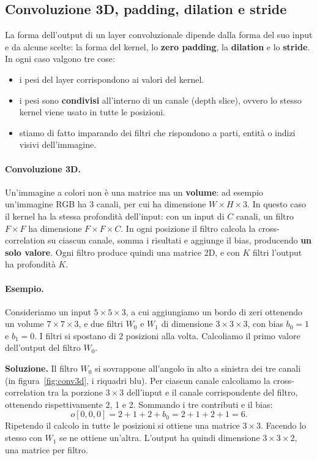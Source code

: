 \subsection{Convoluzione 3D, padding, dilation e stride}
La forma dell'output di un layer convoluzionale dipende dalla forma del suo input e da alcune scelte: la forma del kernel, lo \textbf{zero padding}, la \textbf{dilation} e lo \textbf{stride}. In ogni caso valgono tre cose:
\begin{itemize}
    \item i pesi del layer corrispondono ai valori del kernel.
    \item i pesi sono \textbf{condivisi} all'interno di un canale (depth slice), ovvero lo stesso kernel viene usato in tutte le posizioni.
    \item stiamo di fatto imparando dei filtri che rispondono a parti, entità o indizi visivi dell'immagine.
\end{itemize}

\paragraph{Convoluzione 3D.}
Un'immagine a colori non è una matrice ma un \textbf{volume}: ad esempio un'immagine RGB ha 3 canali, per cui ha dimensione $W \times H \times 3$. In questo caso il kernel ha la stessa profondità dell'input: con un input di $C$ canali, un filtro $F \times F$ ha dimensione $F \times F \times C$. In ogni posizione il filtro calcola la cross-correlation su ciascun canale, somma i risultati e aggiunge il bias, producendo \textbf{un solo valore}. Ogni filtro produce quindi una matrice 2D, e con $K$ filtri l'output ha profondità $K$.

\paragraph{Esempio.}
Consideriamo un input $5 \times 5 \times 3$, a cui aggiungiamo un bordo di zeri ottenendo un volume $7 \times 7 \times 3$, e due filtri $W_0$ e $W_1$ di dimensione $3 \times 3 \times 3$, con bias $b_0 = 1$ e $b_1 = 0$. I filtri si spostano di 2 posizioni alla volta. Calcoliamo il primo valore dell'output del filtro $W_0$.

\textbf{Soluzione.} Il filtro $W_0$ si sovrappone all'angolo in alto a sinistra dei tre canali (in figura~\ref{fig:conv3d}, i riquadri blu). Per ciascun canale calcoliamo la cross-correlation tra la porzione $3 \times 3$ dell'input e il canale corrispondente del filtro, ottenendo rispettivamente 2, 1 e 2. Sommando i tre contributi e il bias:
\[
o[0, 0, 0] = 2 + 1 + 2 + b_0 = 2 + 1 + 2 + 1 = 6.
\]
Ripetendo il calcolo in tutte le posizioni si ottiene una matrice $3 \times 3$. Facendo lo stesso con $W_1$ se ne ottiene un'altra. L'output ha quindi dimensione $3 \times 3 \times 2$, una matrice per filtro.

